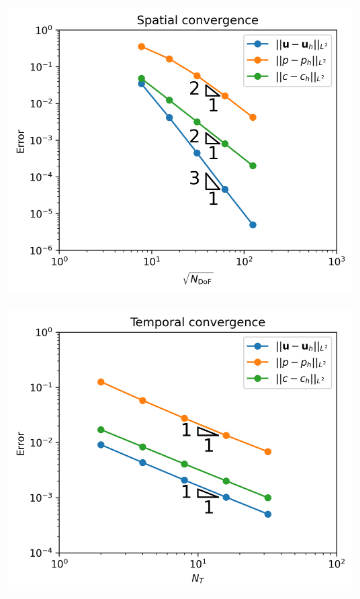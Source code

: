         \begin{figure}
            \centering
            \begin{subfigure}{0.45\textwidth}
                \centering
                \includegraphics[width=\textwidth]{diagrams/results-convergence/spatial_convergence.png}
                \caption{}
                \label{fig:mms-convergence:space}
            \end{subfigure}
            \hfill
            \begin{subfigure}{0.45\textwidth}
                \centering
                \includegraphics[width=\textwidth]{diagrams/results-convergence/temporal_convergence.png}

\end{subfigure}
\end{figure}
